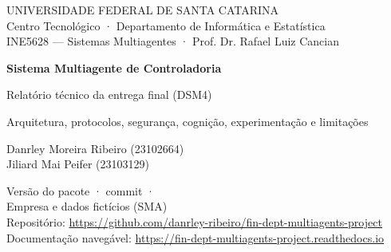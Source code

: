 \documentclass[10pt,a4paper]{article}
\newcommand{\autorA}{Danrley Moreira Ribeiro}
\newcommand{\matA}{23102664}
\newcommand{\autorB}{Jiliard Mai Peifer}
\newcommand{\matB}{23103129}
\newcommand{\repoURL}{https://github.com/danrley-ribeiro/fin-dept-multiagents-project}
\newcommand{\docsURL}{https://fin-dept-multiagents-project.readthedocs.io}
\begin{document}
\begin{titlepage}
\centering
\vspace*{2.5cm}
{\small UNIVERSIDADE FEDERAL DE SANTA CATARINA\\Centro Tecnológico · Departamento de Informática e Estatística\\INE5628 — Sistemas Multiagentes · Prof. Dr. Rafael Luiz Cancian\par}
\vspace{3cm}
{\LARGE\bfseries Sistema Multiagente de Controladoria\par}
\vspace{0.6em}
{\Large Relatório técnico da entrega final (DSM4)\par}
\vspace{0.8em}
{\normalsize Arquitetura, protocolos, segurança, cognição, experimentação e limitações\par}
\vspace{3cm}
{\large \autorA{} (\matA)\\[0.3em] \autorB{} (\matB)\par}
\vfill
{\small Versão do pacote  · commit  · \\
Empresa e dados fictícios (SMA)\\[0.6em]
Repositório: \url{\repoURL}\\ Documentação navegável: \url{\docsURL}\par}
\vspace{1cm}
\end{titlepage}

\tableofcontents
\clearpage

\end{document}
